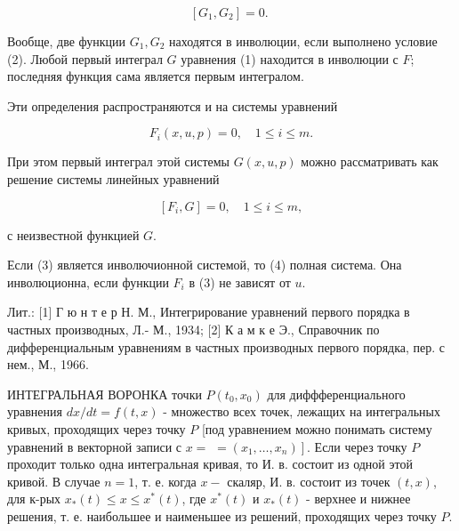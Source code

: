 \documentclass[10pt]{article}
\begin{document}
\[

\left[G_{1}, G_{2}\right]=0 \text {. }

\]



Вообще, две функции $G_{1}, G_{2}$ находятся в инволюции, если выполнено условие (2). Любой первый интеграл $G$ уравнения (1) находится в инволюции с $F$; последняя функция сама является первым интегралом.



Эти определения распространяются и на системы уравнений



\[

F_{i}(x, u, p)=0, \quad 1 \leqslant i \leqslant m .

\]



При этом первый интеграл этой системы $G(x, u, p)$ можно рассматривать как решение системы линейных уравнений



\[

\left[F_{i}, G\right]=0, \quad 1 \leqslant i \leqslant m,

\]



с неизвестной функцией $G$.



Если (3) является инволючионной системой, то (4) полная система. Она инволюционна, если функции $F_{i}$ в (3) не зависят от $u$.



Лит.: [1] Г ю н т е р Н. М., Интегрирование уравнений первого порядка в частных производных, Л.- М., 1934; [2] К а м к е Э., Справочник по дифференциальным уравнениям в частных производных первого порядка, пер. с нем., М., 1966.



ИНТЕГРАЛЬНАЯ ВОРОНКА точки $P\left(t_{0}, x_{0}\right)$ для диффференциального уравнения $d x / d t=f(t, x)$ - множество всех точек, лежащих на интегральных кривых, проходящих через точку $P$ [под уравнением можно понимать систему уравнений в векторной записи с $x=$ $\left.=\left(x_{1}, \ldots, x_{n}\right)\right]$. Если через точку $P$ проходит только одна интегральная кривая, то И. в. состоит из одной этой кривой. В случае $n=1$, т. е. когда $x-$ скаляр, И. в. состоит из точек $(t, x)$, для к-рых $x_{*}(t) \leqslant x \leqslant x^{*}(t)$, где $x^{*}(t)$ и $x_{*}(t)$ - верхнее и нижнее решения, т. е. наибольшее и наименьшее из решений, проходящих через точку $P$.
\end{document}
